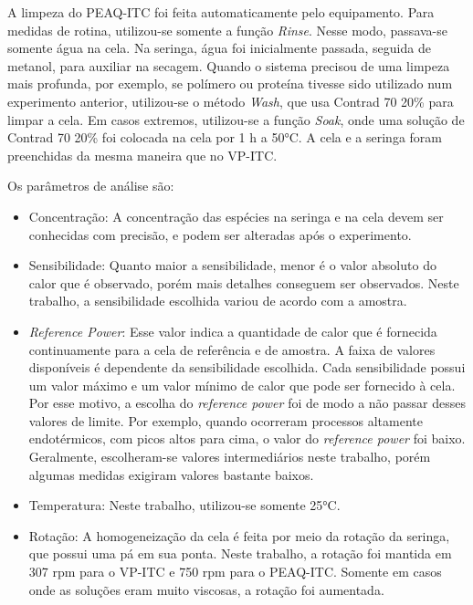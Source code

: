 		A limpeza do PEAQ-ITC foi feita automaticamente pelo equipamento. Para medidas de rotina, utilizou-se somente a função \emph{Rinse}. Nesse modo, passava-se somente água na cela. Na seringa, água foi inicialmente passada, seguida de metanol, para auxiliar na secagem. Quando o sistema precisou de uma limpeza mais profunda, por exemplo, se polímero ou proteína tivesse sido utilizado num experimento anterior, utilizou-se o método \emph{Wash}, que usa Contrad 70 20\% para limpar a cela. Em casos extremos, utilizou-se a função \emph{Soak}, onde uma solução de Contrad 70 20\% foi colocada na cela por 1 h a 50°C. A cela e a seringa foram preenchidas da mesma maneira que no VP-ITC.
		
		Os parâmetros de análise são:
		
		\begin{itemize}[noitemsep]
			
			\item Concentração: A concentração das espécies na seringa e na cela devem ser conhecidas com precisão, e podem ser alteradas após o experimento.
			
			\item Sensibilidade: Quanto maior a sensibilidade, menor é o valor absoluto do calor que é observado, porém mais detalhes conseguem ser observados. Neste trabalho, a sensibilidade escolhida variou de acordo com a amostra.
			
			\item \emph{Reference Power}: Esse valor indica a quantidade de calor que é fornecida continuamente para a cela de referência e de amostra. A faixa de valores disponíveis é dependente da sensibilidade escolhida. Cada sensibilidade possui um valor máximo e um valor mínimo de calor que pode ser fornecido à cela. Por esse motivo, a escolha do \emph{reference power} foi de modo a não passar desses valores de limite. Por exemplo, quando ocorreram processos altamente endotérmicos, com picos altos para cima, o valor do \emph{reference power} foi baixo. Geralmente, escolheram-se valores intermediários neste trabalho, porém algumas medidas exigiram valores bastante baixos.
			
			\item Temperatura: Neste trabalho, utilizou-se somente 25°C.
				
			\item Rotação: A homogeneização da cela é feita por meio da rotação da seringa, que possui uma pá em sua ponta. Neste trabalho, a rotação foi mantida em 307 rpm para o VP-ITC e 750 rpm para o PEAQ-ITC. Somente em casos onde as soluções eram muito viscosas, a rotação foi aumentada.
			

\end{itemize}

